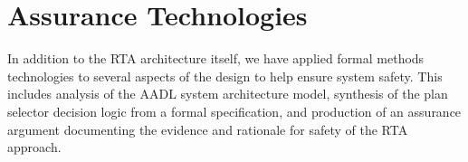 \section{Assurance Technologies}
\label{sec:assurance}


In addition to the RTA architecture itself, we have applied formal methods 
technologies to several aspects of the design to help ensure system safety.  This  
includes analysis of the AADL system architecture model, synthesis of the plan selector 
decision logic from a formal specification, and production of an assurance argument
documenting the evidence and rationale for safety of the RTA approach.  

